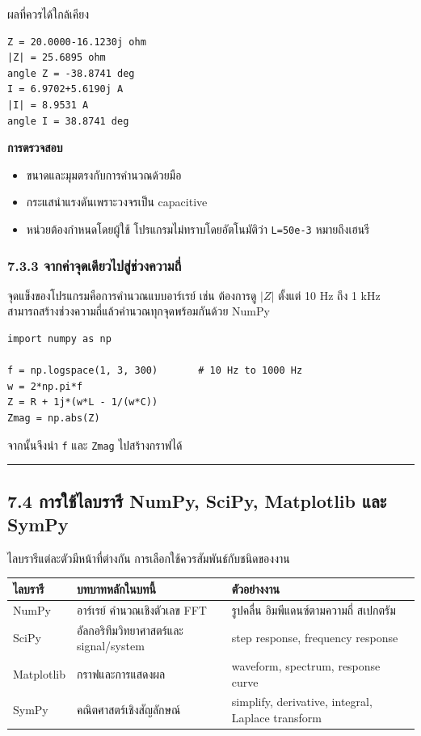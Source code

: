 ผลที่ควรได้ใกล้เคียง

\begin{verbatim}
Z = 20.0000-16.1230j ohm
|Z| = 25.6895 ohm
angle Z = -38.8741 deg
I = 6.9702+5.6190j A
|I| = 8.9531 A
angle I = 38.8741 deg
\end{verbatim}

\textbf{การตรวจสอบ}

\begin{itemize}
    \item ขนาดและมุมตรงกับการคำนวณด้วยมือ
    \item กระแสนำแรงดันเพราะวงจรเป็น capacitive
    \item หน่วยต้องกำหนดโดยผู้ใช้ โปรแกรมไม่ทราบโดยอัตโนมัติว่า \texttt{L=50e-3} หมายถึงเฮนรี
\end{itemize}

\subsubsection{7.3.3 จากค่าจุดเดียวไปสู่ช่วงความถี่}

จุดแข็งของโปรแกรมคือการคำนวณแบบอาร์เรย์ เช่น ต้องการดู $|Z|$ ตั้งแต่ 10 Hz ถึง 1 kHz สามารถสร้างช่วงความถี่แล้วคำนวณทุกจุดพร้อมกันด้วย NumPy

\begin{verbatim}
import numpy as np

f = np.logspace(1, 3, 300)       # 10 Hz to 1000 Hz
w = 2*np.pi*f
Z = R + 1j*(w*L - 1/(w*C))
Zmag = np.abs(Z)
\end{verbatim}

จากนั้นจึงนำ \texttt{f} และ \texttt{Zmag} ไปสร้างกราฟได้

\par\noindent\rule{\textwidth}{0.4pt}\par

\subsection{7.4 การใช้ไลบรารี NumPy, SciPy, Matplotlib และ SymPy}

ไลบรารีแต่ละตัวมีหน้าที่ต่างกัน การเลือกใช้ควรสัมพันธ์กับชนิดของงาน

\begin{table}[htbp]
    \centering
    \begin{tabular}{l l l}
        \hline
        \textbf{ไลบรารี} & \textbf{บทบาทหลักในบทนี้} & \textbf{ตัวอย่างงาน} \\
        \hline
        NumPy & อาร์เรย์ คำนวณเชิงตัวเลข FFT & รูปคลื่น อิมพีแดนซ์ตามความถี่ สเปกตรัม \\
        SciPy & อัลกอริทึมวิทยาศาสตร์และ signal/system & step response, frequency response \\
        Matplotlib & กราฟและการแสดงผล & waveform, spectrum, response curve \\
        SymPy & คณิตศาสตร์เชิงสัญลักษณ์ & simplify, derivative, integral, Laplace transform \\
        \hline
    \end{tabular}
\end{table}

